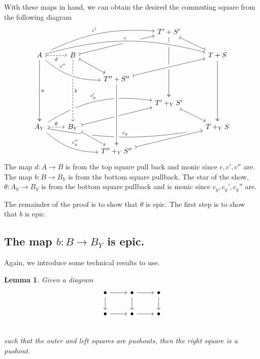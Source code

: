\documentclass[12pt]{article}
\newcommand{\from}{\colon}
\renewcommand{\(}{\left(}
\renewcommand{\)}{\right)}
\renewcommand{\{}{\left\lbrace}
\renewcommand{\}}{\right\rbrace}
\newtheorem*{lem}{Lemma}
\theoremstyle{remark}
\theoremstyle{definition}
\begin{document}
 With these maps in hand, we can obtain the desired the commuting square from the following 
 diagram
 \[
 \begin{tikzcd}
 {} &
 {} &
 {} &
 {T'+S'} 
 \ar[rd,rightarrowtail]
 \ar[ddd,twoheadrightarrow]&
 {} \\
 {A} 
 \ar[ddd,twoheadrightarrow,"a"]  
 \ar[rrru,bend left=15,"c'"] &
 {B} 
 \ar[urr,rightarrowtail]
 \ar[dr,rightarrowtail] &
 {} &
 {} &
 {T+S} 
 \ar[ddd,twoheadrightarrow]\\
 {} &
 {} &
 {T''+S''} &
 {} &
 {} \\
 {} &
 {} &
 {} &
 {T'+_YS'} 
 \ar[dr,rightarrowtail]&
 {} \\
 {A_Y} 
 \ar[rrru,bend left=20,"c'_y"] 
 \ar[r,rightarrowtail, dashed,"\theta"]
 \ar[rrd,bend right=20,"c''_y"] &
 {B_Y} 
 \ar[rru,rightarrowtail] &
 {} &
 {} &
 {T+_YS} \\
 {} &
 {} &
 {T''+_YS''} &
 {} &
 {}
 \ar[from=2-2,to=5-2,crossing over,dashed,"b"]
 \ar[from=2-1,to=3-3,crossing over, bend right=20,  "c''" near start]
 \ar[from=3-3,to=2-5,crossing over,rightarrowtail]
 \ar[from=2-1,to=2-5,crossing over,bend left=15,"c"]
 \ar[from=5-1,to=5-5,bend right=10,"c_y"]
 \ar[from=3-3,to=6-3,crossing over,twoheadrightarrow]
 \ar[from=5-2,to=6-3,crossing over,rightarrowtail]
 \ar[from=6-3,to=5-5,crossing over,rightarrowtail]
 \ar[from=2-1,to=2-2,rightarrowtail,dashed,swap,"d"]
 \end{tikzcd}
 \]
 The map $d \from A \to B$ is from the top square pull back and monic since $c,c',c''$ are. 
 The map $b \from B \to B_Y$ is from the bottom square pullback.  The star of the show, 
 $\theta \from A_Y \to B_Y$ is from the bottom square pullback and is monic since 
 $c_y,c_y',c_y''$ are.  
 
 The remainder of the proof is to show that $\theta$ is epic. The first step is to show 
 that $b$ is epic.
 
 \subsection*{The map $b \from B \to B_Y$ is epic.}
  
  Again, we introduce some technical results to use.
  
  \begin{lem}
  	Given a diagram
  	\[
  	\begin{tikzcd}
	  	{\bullet} \ar[r] \ar[d] &
	  	{\bullet} \ar[r] \ar[d] &
	  	{\bullet} \ar[d]\\
	  	{\bullet} \ar[r]&
	  	{\bullet} \ar[r] &
	  	{\bullet} \\
  	\end{tikzcd}
  	\]
  	such that the outer and left squares are pushouts, then the right square is a pushout. 
  \end{lem}
  
\end{document}
